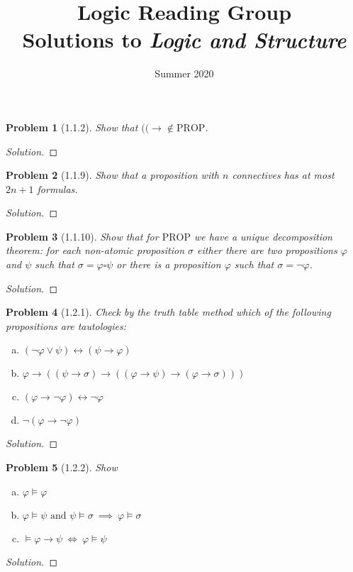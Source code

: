 \documentclass[letter]{article}
\title{Logic Reading Group\\Solutions to \textit{Logic and Structure}}
\date{Summer 2020}
\newtheorem{problem}{Problem}
\theoremstyle{definition}
\newenvironment{solution}
{\begin{proof}[Solution]}
	{\end{proof}}
\renewcommand{\phi}{\varphi}
\begin{document}
\maketitle
 
\newpage
\begin{problem}[1.1.2]
    Show that $(( \to \not \in \textrm{PROP}$.
\end{problem}
\begin{solution}
\end{solution}

\begin{problem}[1.1.9] Show that a proposition with $n$ connectives has at most $2n + 1$ formulas.
\end{problem}
\begin{solution}
\end{solution}

\begin{problem}[1.1.10] Show that for $\textrm{PROP}$ we have a unique decomposition theorem: for each non-atomic proposition $\sigma$ either there are two propositions $\phi$ and $\psi$ such that $\sigma = \phi \square \psi$ or there is a proposition $\phi$ such that $\sigma = \neg \phi$.
\end{problem}
\begin{solution}
\end{solution}

\begin{problem}[1.2.1] Check by the truth table method which of the following propositions are tautologies:
    \begin{enumerate}[(a)]
        \item $(\neg \phi \lor \psi) \leftrightarrow (\psi \to \phi)$
        \item $\phi \to ((\psi \to \sigma)
                          \to
                          ((\phi \to \psi)
                            \to (\phi \to \sigma)
                            ))$
        \item $(\phi \to \neg \phi) \leftrightarrow \neg \phi$
        \item $\neg (\phi \to \neg \phi)$
    \end{enumerate}
\end{problem}
\begin{solution}
\end{solution}

\begin{problem}[1.2.2] Show
    \begin{enumerate}[(a)]
        \item $\phi \models \phi$
        \item $\phi \models \psi \textrm{ and } \psi \models \sigma \> \implies \> \phi \models \sigma$
        \item $\models \phi \to \psi \> \iff \> \phi \models \psi$
    \end{enumerate}
\end{problem}
\begin{solution}
\end{solution}
\end{document}
